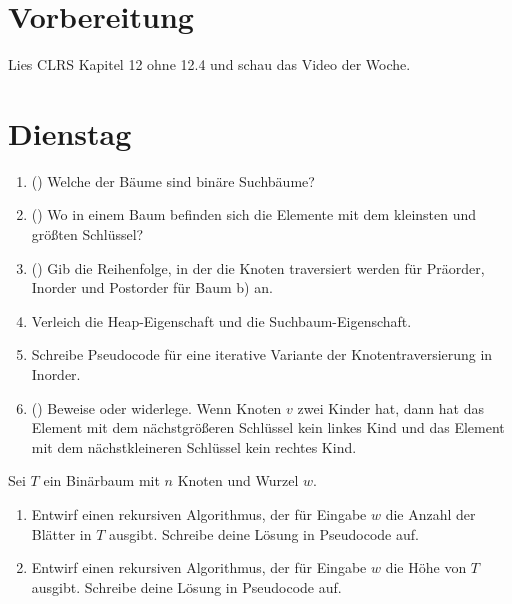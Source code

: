 \documentclass{uebung_cs}
\begin{document}
\section*{Vorbereitung}
Lies CLRS Kapitel 12 ohne 12.4 und schau das Video der Woche.

\section*{Dienstag}
\begin{aufgabe}[Binärbaumeigenschaften]\label{tue-first}
	\begin{enumerate}
		\item (\warmup) Welche der Bäume sind binäre Suchbäume?
		\item (\warmup) Wo in einem Baum befinden sich die Elemente mit dem kleinsten und größten Schlüssel?
		\item (\warmup) Gib die Reihenfolge, in der die Knoten traversiert werden für Präorder, Inorder und Postorder für Baum b) an.
		\item Verleich die Heap-Eigenschaft und die Suchbaum-Eigenschaft.
		\item Schreibe Pseudocode für eine iterative Variante der Knotentraversierung in Inorder.
		\item (\hard) Beweise oder widerlege.
		Wenn Knoten $v$ zwei Kinder hat, dann hat das Element mit dem nächstgrößeren Schlüssel kein linkes Kind und das Element mit dem nächstkleineren Schlüssel kein rechtes Kind.
	\end{enumerate}
\end{aufgabe}

\begin{aufgabe}
	Sei $T$ ein Binärbaum mit $n$ Knoten und Wurzel $w$.
	\begin{enumerate}
		\item Entwirf einen rekursiven Algorithmus, der für Eingabe $w$ die Anzahl der Blätter in $T$ ausgibt.
		Schreibe deine Lösung in Pseudocode auf.
		\item Entwirf einen rekursiven Algorithmus, der für Eingabe $w$ die Höhe von $T$ ausgibt.
		Schreibe deine Lösung in Pseudocode auf.
	\end{enumerate}
\end{aufgabe}
\end{document}
